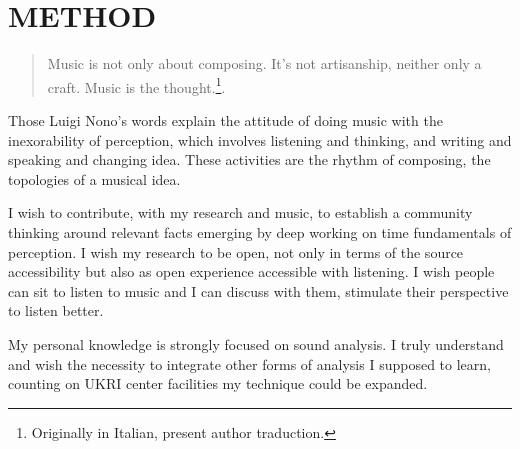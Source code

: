 \documentclass[
	a4paper,
	twocolumn
	]{article}
\begin{document}



\newpage
\section*{METHOD}

\begin{quote}
Music is not only about composing. It’s not artisanship, neither only a craft. Music is the thought.\footnote{Originally in Italian, present author traduction.}\cite{nono85}.
\end{quote}

Those Luigi Nono's words explain the attitude of doing music with the inexorability of perception, which involves listening and thinking, and writing and speaking and changing idea. These activities are the rhythm of composing, the topologies of a musical idea.

I wish to contribute, with my research and music, to establish a community thinking around relevant facts emerging by deep working on time fundamentals of perception. I wish my research to be open, not only in terms of the source accessibility but also as open experience accessible with listening. I wish people can sit to listen to music and I can discuss with them, stimulate their perspective to listen better.

My personal knowledge is strongly focused on sound analysis. I truly understand and wish the necessity to integrate other forms of analysis I supposed to learn, counting on UKRI center facilities my technique could be expanded.


\end{document}
